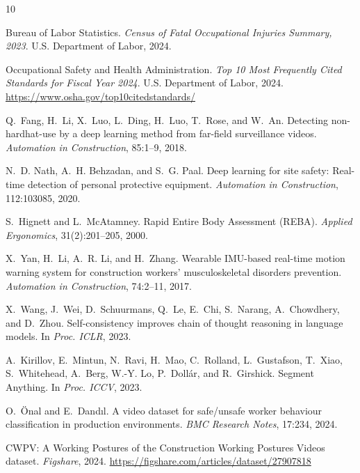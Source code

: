 \documentclass[11pt, twocolumn]{article}
\begin{document}
\begin{thebibliography}{10}
\small
\setlength{\itemsep}{1pt}
\setlength{\parskip}{0pt}

Bureau of Labor Statistics. \textit{Census of Fatal Occupational Injuries Summary, 2023}. U.S. Department of Labor, 2024.

Occupational Safety and Health Administration. \textit{Top 10 Most Frequently Cited Standards for Fiscal Year 2024}. U.S. Department of Labor, 2024. \url{https://www.osha.gov/top10citedstandards/}

Q.~Fang, H.~Li, X.~Luo, L.~Ding, H.~Luo, T.~Rose, and W.~An. Detecting non-hardhat-use by a deep learning method from far-field surveillance videos. \textit{Automation in Construction}, 85:1--9, 2018.

N.~D. Nath, A.~H. Behzadan, and S.~G. Paal. Deep learning for site safety: Real-time detection of personal protective equipment. \textit{Automation in Construction}, 112:103085, 2020.

S.~Hignett and L.~McAtamney. Rapid Entire Body Assessment (REBA). \textit{Applied Ergonomics}, 31(2):201--205, 2000.

X.~Yan, H.~Li, A.~R. Li, and H.~Zhang. Wearable IMU-based real-time motion warning system for construction workers' musculoskeletal disorders prevention. \textit{Automation in Construction}, 74:2--11, 2017.

X.~Wang, J.~Wei, D.~Schuurmans, Q.~Le, E.~Chi, S.~Narang, A.~Chowdhery, and D.~Zhou. Self-consistency improves chain of thought reasoning in language models. In \textit{Proc. ICLR}, 2023.

A.~Kirillov, E.~Mintun, N.~Ravi, H.~Mao, C.~Rolland, L.~Gustafson, T.~Xiao, S.~Whitehead, A.~Berg, W.-Y. Lo, P.~Doll{\'a}r, and R.~Girshick. Segment Anything. In \textit{Proc. ICCV}, 2023.

O.~\"Onal and E.~Dand{\i}l. A video dataset for safe/unsafe worker behaviour classification in production environments. \textit{BMC Research Notes}, 17:234, 2024.

CWPV: A Working Postures of the Construction Working Postures Videos dataset. \textit{Figshare}, 2024. \url{https://figshare.com/articles/dataset/27907818}

\end{thebibliography}
\end{document}
